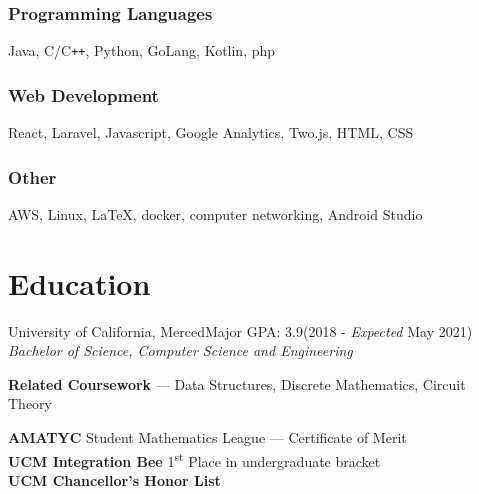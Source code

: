 \documentclass[letterpaper,12pt]{article}
\begin{document}
    \subsubsection{Programming Languages}
    Java, C/C\verb!++!, Python, GoLang, Kotlin, php
    \vspace*{-4mm}
    \subsubsection{Web Development}
    React, Laravel, Javascript, Google Analytics, Two.js, HTML, CSS
    \vspace*{-4mm}
    \subsubsection{Other}
    AWS, Linux, \LaTeX, docker, computer networking, Android Studio
    \vspace*{-4mm}
\section{Education}
    University of California, Merced\null\hfill Major GPA: 3.9\quad (2018 - \emph{Expected} May 2021)\\
    \emph{Bachelor of Science, Computer Science and Engineering}
    \begin{center}
        \textbf{Related Coursework} --- Data Structures, Discrete Mathematics, Circuit Theory
    \end{center}
    \textbf{AMATYC} Student Mathematics League --- Certificate of Merit\\
    \textbf{UCM Integration Bee} 1\textsuperscript{st} Place in undergraduate bracket\\
    \textbf{UCM Chancellor's Honor List}
\end{document}
